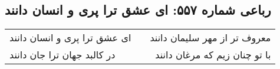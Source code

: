 \begin{center}
\section*{رباعی شماره ۵۵۷: ای عشق ترا پری و انسان دانند}
\label{sec:0557}
\begin{longtable}{l p{0.5cm} r}
ای عشق ترا پری و انسان دانند
&&
معروف تر از مهر سلیمان دانند
\\
در کالبد جهان ترا جان دانند
&&
با تو چنان زیم که مرغان دانند
\\
\end{longtable}
\end{center}
